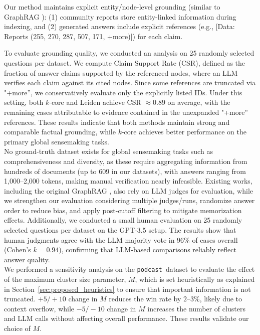 \documentclass[sigconf]{acmart}
\newcommand{\podcast}{\texttt{podcast\,}}
\begin{document}
Our method maintains explicit entity/node-level grounding (similar to GraphRAG \cite{edge24}): (1) community reports store entity-linked information during indexing, and (2) generated answers include explicit references (e.g., [Data: Reports (255, 270, 287, 507, 171, +more)]) for each claim.

To evaluate grounding quality, we conducted an analysis on 25 randomly selected questions per dataset. We compute Claim Support Rate (CSR), defined as the fraction of answer claims supported by the referenced nodes, where an LLM verifies each claim against its cited nodes. Since some references are truncated via "+more'', we conservatively evaluate only the explicitly listed IDs. Under this setting, both $k$-core and Leiden achieve CSR $\approx 0.89$ on average, with the remaining cases attributable to evidence contained in the unexpanded "+more” references. These results indicate that both methods maintain strong and comparable factual grounding, while $k$-core achieves better performance on the primary global sensemaking tasks.\\

No ground-truth dataset exists for global sensemaking tasks such as comprehensiveness and diversity, as these require aggregating information from hundreds of documents (up to 609 in our datasets), with answers ranging from 1,000–2,000 tokens, making manual verification nearly infeasible. Existing works, including the original GraphRAG \cite{edge24}, also rely on LLM judges for evaluation, while we strengthen our evaluation considering multiple judges/runs, randomize answer order to reduce bias, and apply post-cutoff filtering to mitigate memorization effects. Additionally, we conducted a small human evaluation on 25 randomly selected questions per dataset on the GPT-3.5 setup. The results show that human judgments agree with the LLM majority vote in 96\% of cases overall (Cohen’s $k = 0.94$), confirming that LLM-based comparisons reliably reflect answer quality.\\

We performed a sensitivity analysis on the \podcast dataset to evaluate the effect of the maximum cluster size parameter, $M$, which is set heuristically as explained in Section~\ref{sec:proposed_heuristics} to ensure that important information is not truncated. $+5/+10$ change in $M$ reduces the win rate by $2$--$3\%$, likely due to context overflow, while $-5/-10$ change in $M$ increases the number of clusters and LLM calls without affecting overall performance. These results validate our choice of $M$.\\
\end{document}
